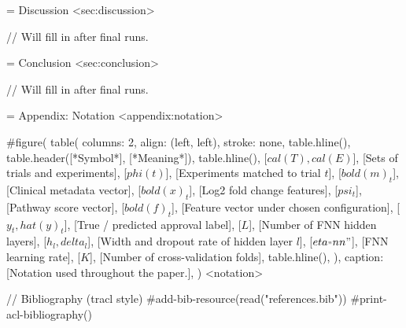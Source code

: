 = Discussion <sec:discussion>

// Will fill in after final runs.

= Conclusion <sec:conclusion>

// Will fill in after final runs.


= Appendix: Notation <appendix:notation>

#figure(
  table(
    columns: 2,
    align: (left, left),
    stroke: none,
    table.hline(),
    table.header([*Symbol*], [*Meaning*]),
    table.hline(),
    [$cal(T), cal(E)$], [Sets of trials and experiments],
    [$phi(t)$], [Experiments matched to trial $t$],
    [$bold(m)_t$], [Clinical metadata vector],
    [$bold(x)_t$], [Log2 fold change features],
    [$psi_t$], [Pathway score vector],
    [$bold(f)_t$], [Feature vector under chosen configuration],
    [$y_t, hat(y)_t$], [True / predicted approval label],
    [$L$], [Number of FNN hidden layers],
    [$h_l, delta_l$], [Width and dropout rate of hidden layer $l$],
    [$eta_"nn"$], [FNN learning rate],
    [$K$], [Number of cross-validation folds],
    table.hline(),
  ),
  caption: [Notation used throughout the paper.],
) <notation>

// Bibliography (tracl style)
#add-bib-resource(read("references.bib"))
#print-acl-bibliography()
